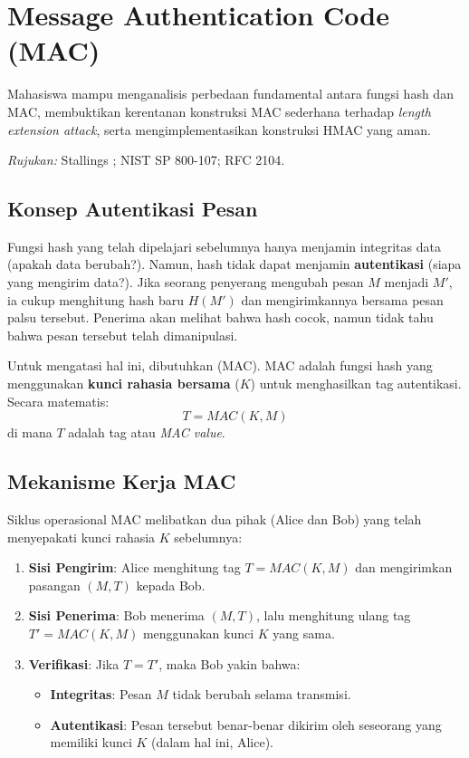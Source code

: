 \section{Message Authentication Code (MAC)}

\begin{subcpmk}
  \item Mahasiswa mampu menganalisis perbedaan fundamental antara fungsi hash dan MAC, membuktikan kerentanan konstruksi MAC sederhana terhadap \textit{length extension attack}, serta mengimplementasikan konstruksi HMAC yang aman.
\end{subcpmk}

\noindent\textit{Rujukan:} Stallings \cite{stallings2017}; NIST SP 800-107; RFC 2104.

\subsection{Konsep Autentikasi Pesan}

Fungsi hash yang telah dipelajari sebelumnya hanya menjamin integritas data (apakah data berubah?). Namun, hash tidak dapat menjamin \textbf{autentikasi} (siapa yang mengirim data?). Jika seorang penyerang mengubah pesan $M$ menjadi $M'$, ia cukup menghitung hash baru $H(M')$ dan mengirimkannya bersama pesan palsu tersebut. Penerima akan melihat bahwa hash cocok, namun tidak tahu bahwa pesan tersebut telah dimanipulasi.

Untuk mengatasi hal ini, dibutuhkan  (MAC). MAC adalah fungsi hash yang menggunakan \textbf{kunci rahasia bersama} ($K$) untuk menghasilkan tag autentikasi. Secara matematis:
\begin{equation}
  T = MAC(K, M)
\end{equation}
di mana $T$ adalah tag atau \textit{MAC value}.

\subsection{Mekanisme Kerja MAC}

Siklus operasional MAC melibatkan dua pihak (Alice dan Bob) yang telah menyepakati kunci rahasia $K$ sebelumnya:
\begin{enumerate}
    \item \textbf{Sisi Pengirim}: Alice menghitung tag $T = MAC(K, M)$ dan mengirimkan pasangan $(M, T)$ kepada Bob.
    \item \textbf{Sisi Penerima}: Bob menerima $(M, T)$, lalu menghitung ulang tag $T' = MAC(K, M)$ menggunakan kunci $K$ yang sama.
    \item \textbf{Verifikasi}: Jika $T = T'$, maka Bob yakin bahwa:
    \begin{itemize}
        \item \textbf{Integritas}: Pesan $M$ tidak berubah selama transmisi.
        \item \textbf{Autentikasi}: Pesan tersebut benar-benar dikirim oleh seseorang yang memiliki kunci $K$ (dalam hal ini, Alice).
    \end{itemize}
\end{enumerate}

